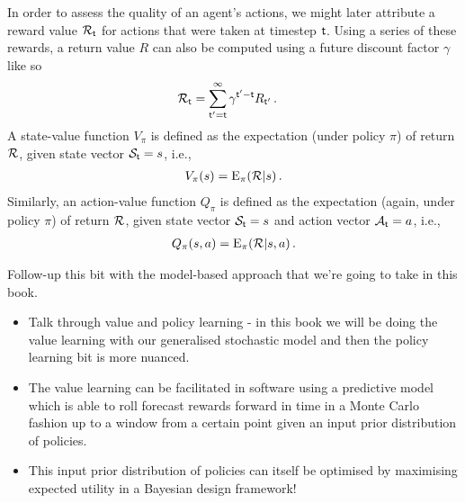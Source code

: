 In order to assess the quality of an agent's actions, we might later attribute a reward value ${\cal R}_{{\sf t}}$ for actions that were taken at timestep ${\sf t}$. Using a series of these rewards, a return value $R$ can also be computed using a future discount factor $\gamma$ like so 
\begin{align}
{\cal R}_{{\sf t}} &= \sum_{{\sf t}'={\sf t}}^\infty \gamma^{{\sf t}'-{\sf t}}R_{{\sf t}'} \,.
\end{align}
A state-value function $V_\pi$ is defined as the expectation (under policy $\pi$) of return ${\cal R}$, given state vector ${\cal S}_{\sf t}=s$, i.e.,
\begin{align}
V_\pi (s) = {\rm E}_\pi ({\cal R}\vert s) \,.
\end{align}
Similarly, an action-value function $Q_\pi$ is defined as the expectation (again, under policy $\pi$) of return ${\cal R}$, given state vector ${\cal S}_{\sf t}=s$ and action vector ${\cal A}_{\sf t}=a$, i.e.,
\begin{align}
Q_\pi (s,a) = {\rm E}_\pi ({\cal R}\vert s,a) \,.
\end{align}

Follow-up this bit with the model-based approach that we're going to take in this book.
\begin{itemize}
\item{Talk through value and policy learning - in this book we will be doing the value learning with our generalised stochastic model and then the policy learning bit is more nuanced.}
\item{The value learning can be facilitated in software using a predictive model which is able to roll forecast rewards forward in time in a Monte Carlo fashion up to a window from a certain point given an input prior distribution of policies.}
\item{This input prior distribution of policies can itself be optimised by maximising expected utility in a Bayesian design framework!}
\end{itemize}